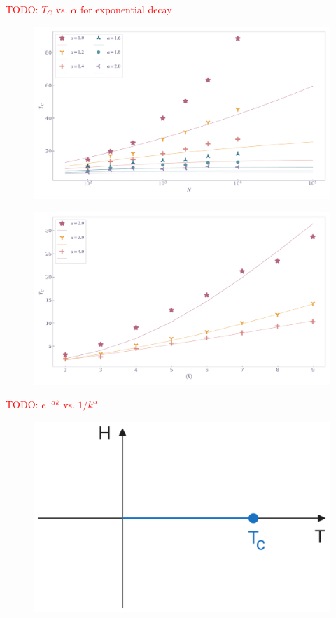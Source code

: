 \documentclass[11pt,a4paper]{article}
\newcommand{\todo}[1]{\textcolor{red}{TODO: #1}}
\begin{document}
\todo{$T_C$ vs. $\alpha$ for exponential decay}
\begin{figure}[ht!]
    \includegraphics[width=\linewidth]{../figures/TC_vs_size.pdf}
\end{figure}

\begin{figure}[ht!]
    \includegraphics[width=\linewidth]{../figures/TC_vs_k.pdf}
\end{figure}

\todo{$e^{-\alpha k}$ vs. $1/k^\alpha$}

\begin{figure}[ht!]
    \centering
    \includegraphics[width=0.7\linewidth]{../figures/phase-diagram.pdf}
\end{figure}
\end{document}
